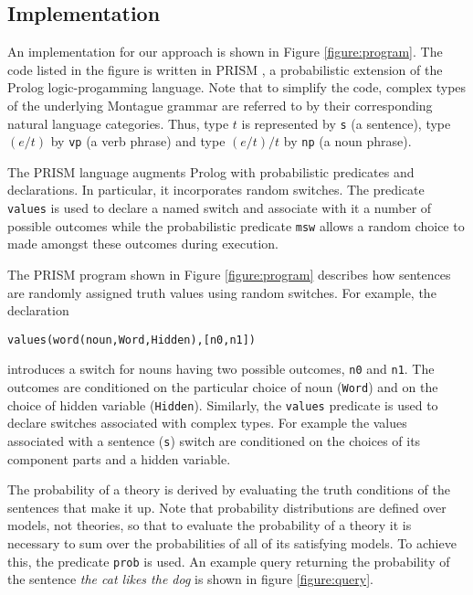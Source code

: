 \documentclass{svmult}
\begin{document}
\subsection{Implementation}


An implementation for our approach is shown in Figure 
\ref{figure:program}. The code listed in the figure is written in PRISM \cite{Sato:97}, a probabilistic extension of the Prolog logic-progamming language. Note that to simplify the code, complex types of the underlying Montague grammar are referred to by their corresponding natural language
categories. Thus, type $t$ is represented by \texttt{s} (a sentence), type $(e/t)$ by \texttt{vp} (a verb phrase) and type $(e/t)/t$ by \texttt{np} (a noun phrase). 

The PRISM language augments Prolog with probabilistic predicates and declarations. In particular, it incorporates random switches. The predicate \texttt{values} is used to declare a named switch and associate with it a number of possible outcomes while the probabilistic predicate \texttt{msw} allows a random choice to made amongst these outcomes during execution. 

The PRISM program shown in Figure \ref{figure:program} describes how sentences are randomly assigned truth values using random switches. For example, the declaration 
\begin{center}
\texttt{values(word(noun,Word,Hidden),[n0,n1])} 
\end{center}
introduces a switch for nouns having two possible outcomes, \texttt{n0} and \texttt{n1}.
The outcomes are conditioned on the particular choice of noun (\texttt{Word}) and on the choice of hidden variable (\texttt{Hidden}). Similarly, the \texttt{values} predicate is used to declare switches associated with complex types. For example the values associated with a sentence (\texttt{s}) switch are conditioned on the choices of its component parts and a hidden variable.

The probability of a theory is derived by evaluating the truth conditions of the sentences that make it up. Note that probability distributions are defined over models, not theories, so that  to evaluate the
probability of a theory it is necessary to sum over the probabilities of all of its satisfying models. To achieve this,  the predicate \texttt{prob} is used. An
example query returning the probability of the sentence {\em the cat likes the dog\/} is shown in figure \ref{figure:query}. 
\end{document}
